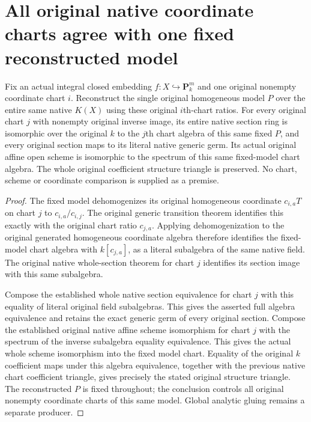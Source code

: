 \section{All original native coordinate charts agree with one fixed reconstructed model}
\label{sec:projective-fixed-native-model-charts}

\begin{theorem}
\label{thm:projective-fixed-native-model-charts}
\leanok
{}
Fix an actual integral closed embedding $f:X\hookrightarrow\mathbf P^m_k$
and one original nonempty coordinate chart $i$. Reconstruct the single
original homogeneous model $P$ over the entire same native $K(X)$ using
these original $i$th-chart ratios. For every original chart $j$ with
nonempty original inverse image, its entire native section ring is
isomorphic over the original $k$ to the $j$th chart algebra of this same
fixed $P$, and every original section maps to its literal native generic
germ. Its actual original affine open scheme is isomorphic to the
spectrum of this same fixed-model chart algebra. The whole original
coefficient structure triangle is preserved. No chart, scheme or
coordinate comparison is supplied as a premise.
\end{theorem}
\begin{proof}
The fixed model dehomogenizes its original homogeneous coordinate
$c_{i,a}T$ on chart $j$ to $c_{i,a}/c_{i,j}$. The original generic
transition theorem identifies this exactly with the original chart
ratio $c_{j,a}$. Applying dehomogenization to the original generated
homogeneous coordinate algebra therefore identifies the fixed-model
chart algebra with $k[c_{j,a}]$, as a literal subalgebra of the same
native field. The original native whole-section theorem for chart $j$
identifies its section image with this same subalgebra.

Compose the established whole native section equivalence for chart $j$
with this equality of literal original field subalgebras. This gives
the asserted full algebra equivalence and retains the exact generic
germ of every original section. Compose the established original native
affine scheme isomorphism for chart $j$ with the spectrum of the inverse
subalgebra equality equivalence. This gives the actual whole scheme
isomorphism into the fixed model chart. Equality of the original $k$
coefficient maps under this algebra equivalence, together with the
previous native chart coefficient triangle, gives precisely the stated
original structure triangle. The reconstructed $P$ is fixed throughout;
the conclusion controls all original nonempty coordinate charts of
this same model. Global analytic gluing remains a separate producer.
\end{proof}
